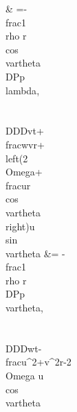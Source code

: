    & =-\\frac{1}{\\rho r\\cos\\vartheta}\\DP{p}{\\lambda}, \\\\
  \\DDD{v}{t}+\\frac{wv}{r}+\\left(2\\Omega+\\frac{u}{r\\cos\\vartheta}\\right)u\\sin\\vartheta
   &= -\\frac{1}{\\rho r}\\DP{p}{\\vartheta}, \\\\
  \\DDD{w}{t}-\\frac{u^2+v^2}{r}-2\\Omega u\\cos\\vartheta
